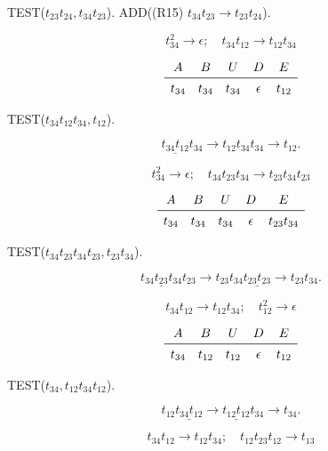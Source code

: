 \documentclass{article}
\begin{document}
TEST($t_{23}t_{24}, t_{34} t_{23}$).
ADD((R15) $t_{34} t_{23} \rightarrow t_{23}t_{24}$).


\[
t_{34}^2 \rightarrow \epsilon; \quad
t_{34} t_{12} \rightarrow t_{12} t_{34}
\]

\[
\begin{array}{ccccc}
A & B & U & D & E \\
\midrule 
t_{34} & t_{34} & t_{34} & \epsilon  & t_{12}
\end{array}
\]

TEST($t_{34}t_{12} t_{34}, t_{12}$).

\[ \underline{t_{34}t_{12}} t_{34} \rightarrow t_{12} t_{34} t_{34} \rightarrow t_{12}.\]



\[
t_{34}^2 \rightarrow \epsilon; \quad
t_{34} t_{23} t_{34} \rightarrow t_{23} t_{34} t_{23}
\]

\[
\begin{array}{ccccc}
A & B & U & D & E \\
\midrule
t_{34} & t_{34} & t_{34} & \epsilon & t_{23} t_{34}
\end{array}
\]

TEST($t_{34}t_{23} t_{34} t_{23}, t_{23} t_{34}$).

\[ \underline{t_{34}t_{23} t_{34}}t_{23} \rightarrow t_{23} t_{34} \underline{t_{23} t_{23}} \rightarrow t_{23} t_{34}.\]


\[
t_{34} t_{12} \rightarrow t_{12} t_{34}; \quad
t_{12}^2 \rightarrow \epsilon
\]

\[
\begin{array}{ccccc}
A & B & U & D & E \\
\midrule 
t_{34} & t_{12} & t_{12} & \epsilon  & t_{12}
\end{array}
\]

TEST($t_{34}, t_{12} t_{34} t_{12}$).

\[t_{12} \underline{t_{34} t_{12}} \rightarrow \underline{t_{12} t_{12}} t_{34} \rightarrow t_{34}.\]


\[
t_{34} t_{12} \rightarrow t_{12} t_{34}; \quad
t_{12} t_{23} t_{12} \rightarrow t_{13}
\]
\end{document}
